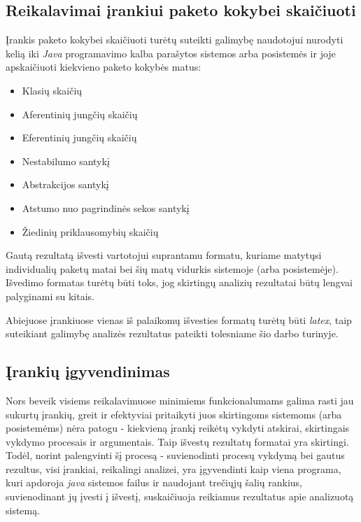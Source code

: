 \subsection{Reikalavimai įrankiui paketo kokybei skaičiuoti}
Įrankis paketo kokybei skaičiuoti turėtų suteikti galimybę naudotojui nurodyti kelią iki \textit{Java} programavimo kalba parašytos sistemos arba posistemės ir joje
apskaičiuoti kiekvieno paketo kokybės matus:
\begin{itemize}
    \item Klasių skaičių
    \item Aferentinių jungčių skaičių
    \item Eferentinių jungčių skaičių
    \item Nestabilumo santykį
    \item Abstrakcijos santykį
    \item Atstumo nuo pagrindinės sekos santykį
    \item Žiedinių priklausomybių skaičių
\end{itemize}
Gautą rezultatą išvesti vartotojui suprantamu formatu, kuriame matytųsi individualių paketų matai bei šių matų vidurkis sistemoje (arba posistemėje).
Išvedimo formatas turėtų būti toks, jog skirtingų analizių rezultatai būtų lengvai palyginami su kitais.

Abiejuose įrankiuose vienas iš palaikomų išvesties formatų turėtų būti \textit{latex}, taip suteikiant galimybę analizės rezultatus pateikti tolesniame šio darbo turinyje.

\subsection{Įrankių įgyvendinimas}
Nors beveik visiems reikalavimuose minimiems funkcionalumams galima rasti jau sukurtų įrankių, greit ir efektyviai pritaikyti juos skirtingoms sistemoms
(arba posistemėms) nėra patogu - kiekvieną įrankį reikėtų vykdyti atskirai, skirtingais vykdymo procesais ir argumentais.
Taip išvestų rezultatų formatai yra skirtingi.
Todėl, norint palengvinti šį procesą - suvienodinti procesų vykdymą bei gautus rezultus, visi įrankiai, reikalingi analizei, yra įgyvendinti kaip viena programa, kuri
apdoroja \textit{java} sistemos failus ir naudojant trečiųjų šalių rankius, suvienodinant jų įvesti į išvestį, suskaičiuoja reikiamus rezultatus apie analizuotą sistemą.

